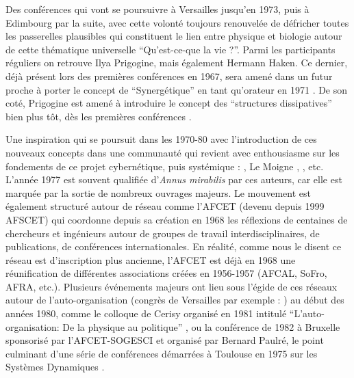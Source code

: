 Des conférences qui vont se poursuivre à Versailles jusqu'en 1973, puis à Edimbourg par la suite, avec cette volonté toujours renouvelée de défricher toutes les passerelles plausibles qui constituent le lien entre physique et biologie autour de cette thématique universelle \enquote{Qu'est-ce-que la vie ?}. Parmi les participants réguliers on retrouve Ilya Prigogine, mais également Hermann Haken. Ce dernier, déjà présent lors des premières conférences en 1967, sera amené dans un futur proche à porter le concept de \enquote{Synergétique} en tant qu'orateur en 1971 \autocites{Kroger2012, Kroger2015}. De son coté,  Prigogine est amené à introduire le concept des \enquote{structures dissipatives} bien plus tôt, dès les premières conférences \autocite[60]{Stengers1985}.

Une inspiration qui se poursuit dans les 1970-80 avec l'introduction de ces nouveaux concepts dans une communauté qui revient avec enthousiasme sur les fondements de ce projet cybernétique, puis systémique : \textcite{Morin1974}, Le Moigne \textcite{Lemoigne1977}, \textcites{Dumouchel1983,CREA1985b}, etc. L'année 1977 est souvent qualifiée d'\textit{Annus mirabilis} par ces auteurs, car elle est marquée par la sortie de nombreux ouvrages majeurs. Le mouvement est également structuré autour de réseau comme l'AFCET (devenu depuis 1999 AFSCET) qui coordonne depuis sa création en 1968 \autocite{Hoffsaes1990} les réflexions de centaines de chercheurs et ingénieurs autour de groupes de travail interdisciplinaires, de publications, de conférences internationales. En réalité, comme nous le disent \textcites{Hoffsaes1990}[404-420]{Mounier2010} ce réseau est d'inscription plus ancienne, l'AFCET est déjà en 1968 une réunification de différentes associations créées en 1956-1957 (AFCAL, SoFro, AFRA, etc.). Plusieurs événements majeurs ont lieu sous l'égide de ces réseaux autour de l'auto-organisation (congrès de Versailles par exemple : \autocite{Prigogine1977}) au début des années 1980, comme le colloque de Cerisy organisé en 1981 intitulé \enquote{L'auto-organisation: De la physique au politique} \autocite{Dumouchel1983}, ou la conférence de 1982 à Bruxelle sponsorisé par l'AFCET-SOGESCI et organisé par Bernard Paulré, le point culminant d'une série de conférences démarrées à Toulouse en 1975 sur les Systèmes Dynamiques \autocite{Andersen2007}.


